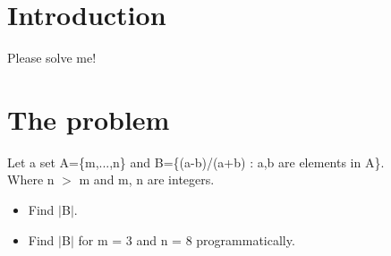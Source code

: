 \section{Introduction}
Please solve me!
\section{The problem}
Let a set A=\{m,...,n\} and B=\{(a-b)/(a+b) : a,b are elements in A\}. \\
Where n $>$ m and m, n are integers.
\begin{itemize}
    \item Find $|$B$|$.
    \item Find $|$B$|$ for m = 3 and n = 8 programmatically.
\end{itemize}

